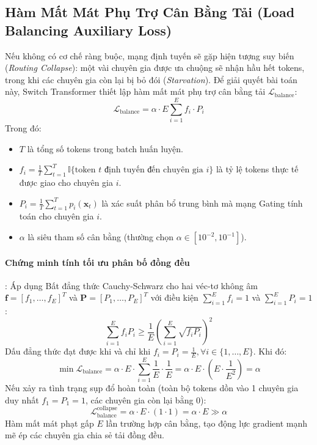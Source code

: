 \subsection{Hàm Mất Mát Phụ Trợ Cân Bằng Tải (Load Balancing Auxiliary Loss)}
Nếu không có cơ chế ràng buộc, mạng định tuyến sẽ gặp hiện tượng suy biến (\textit{Routing Collapse}): một vài chuyên gia được ưa chuộng sẽ nhận hầu hết tokens, trong khi các chuyên gia còn lại bị bỏ đói (\textit{Starvation}).
Để giải quyết bài toán này, Switch Transformer thiết lập hàm mất mát phụ trợ cân bằng tải $\mathcal{L}_{\text{balance}}$:
\begin{equation}
\mathcal{L}_{\text{balance}} = \alpha \cdot E \sum_{i=1}^E f_i \cdot P_i
\end{equation}
Trong đó:
\begin{itemize}
  \item $T$ là tổng số tokens trong batch huấn luyện.
  \item $f_i = \frac{1}{T} \sum_{t=1}^T \mathbb{I}\{\text{token } t \text{ định tuyến đến chuyên gia } i\}$ là tỷ lệ tokens thực tế được giao cho chuyên gia $i$.
  \item $P_i = \frac{1}{T} \sum_{t=1}^T p_i(\mathbf{x}_t)$ là xác suất phân bổ trung bình mà mạng Gating tính toán cho chuyên gia $i$.
  \item $\alpha$ là siêu tham số cân bằng (thường chọn $\alpha \in [10^{-2}, 10^{-1}]$).
\end{itemize}

\paragraph{Chứng minh tính tối ưu phân bố đồng đều}:
Áp dụng Bất đẳng thức Cauchy-Schwarz cho hai véc-tơ không âm $\mathbf{f} = [f_1, \dots, f_E]^T$ và $\mathbf{P} = [P_1, \dots, P_E]^T$ với điều kiện $\sum_{i=1}^E f_i = 1$ và $\sum_{i=1}^E P_i = 1$:
\begin{equation}
\sum_{i=1}^E f_i P_i \ge \frac{1}{E} \left(\sum_{i=1}^E \sqrt{f_i P_i}\right)^2
\end{equation}
Dấu đẳng thức đạt được khi và chỉ khi $f_i = P_i = \frac{1}{E}, \forall i \in \{1, \dots, E\}$. Khi đó:
\begin{equation}
\min \mathcal{L}_{\text{balance}} = \alpha \cdot E \cdot \sum_{i=1}^E \frac{1}{E} \cdot \frac{1}{E} = \alpha \cdot E \cdot \left(E \cdot \frac{1}{E^2}\right) = \alpha
\end{equation}
Nếu xảy ra tình trạng sụp đổ hoàn toàn (toàn bộ tokens dồn vào 1 chuyên gia duy nhất $f_1 = P_1 = 1$, các chuyên gia còn lại bằng 0):
\begin{equation}
\mathcal{L}_{\text{balance}}^{\text{collapse}} = \alpha \cdot E \cdot (1 \cdot 1) = \alpha \cdot E \gg \alpha
\end{equation}
Hàm mất mát phạt gấp $E$ lần trường hợp cân bằng, tạo động lực gradient mạnh mẽ ép các chuyên gia chia sẻ tải đồng đều.

